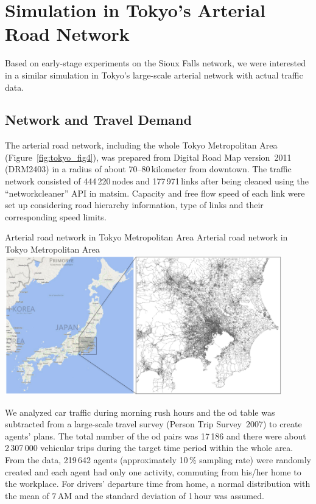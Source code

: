 \section{Simulation in Tokyo's Arterial Road Network}
Based on early-stage experiments on the Sioux Falls network, we were interested in a similar simulation in Tokyo's large-scale arterial network with actual traffic data. 

\subsection{Network and Travel Demand}
The arterial road network, including the whole Tokyo Metropolitan Area (Figure~\ref{fig:tokyo_fig4}), was prepared from Digital Road Map version~2011 (DRM2403) in a radius of about 70--80\,kilometer from downtown. The traffic network consisted of 444\,220\,nodes and 177\,971\,links after being cleaned using the ``networkcleaner'' API in \gls{matsim}. Capacity and free flow speed of each link were set up considering road hierarchy information, type of links and their corresponding speed limits. 

\createfigure%
{Arterial road network in Tokyo Metropolitan Area}%
{Arterial road network in Tokyo Metropolitan Area}%
{\label{fig:tokyo_fig4}}%
{\includegraphics[width=0.90\textwidth, angle=0]{./scenarios/figures/tokyo_fig4.png}}%
{}

We analyzed car traffic during morning rush hours and the \gls{od} table was subtracted from a large-scale travel survey (Person Trip Survey~2007) to create agents' plans. The total number of the \gls{od} pairs was 17\,186 and there were about 2\,307\,000 vehicular trips during the target time period within the whole area. From the data, 219\,642 agents (approximately 10\,\% sampling rate) were randomly created and each agent had only one activity, commuting from his/her home to the workplace. For drivers' departure time from home, a normal distribution with the mean of 7\,AM and the standard deviation of 1\,hour was assumed.


